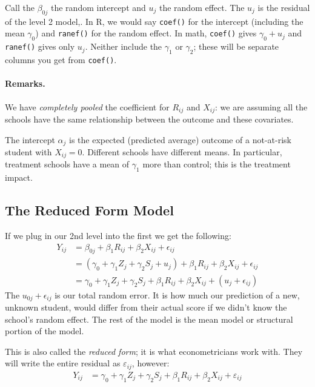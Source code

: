 \documentclass[
  letterpaper,
  DIV=11,
  numbers=noendperiod]{scrreprt}
\let\oldparagraph\paragraph
\renewcommand{\paragraph}[1]{\oldparagraph{#1}\mbox{}}
\begin{document}
Call the \(\beta_{0j}\) the random intercept and \(u_{j}\) the random
effect. The \(u_{j}\) is the residual of the level 2 model,. In R, we
would say \texttt{coef()} for the intercept (including the mean
\(\gamma_0\)) and \texttt{ranef()} for the random effect. In math,
\texttt{coef()} gives \(\gamma_0 + u_j\) and \texttt{ranef()} gives only
\(u_j\). Neither include the \(\gamma_1\) or \(\gamma_2\); these will be
separate columns you get from \texttt{coef()}.

\hypertarget{remarks.}{%
\paragraph{Remarks.}\label{remarks.}}

We have \emph{completely pooled} the coefficient for \(R_{ij}\) and
\(X_{ij}\): we are assuming all the schools have the same relationship
between the outcome and these covariates.

The intercept \(\alpha_{j}\) is the expected (predicted average) outcome
of a not-at-risk student with \(X_{ij} = 0\). Different schools have
different means. In particular, treatment schools have a mean of
\(\gamma_1\) more than control; this is the treatment impact.

\hypertarget{the-reduced-form-model}{%
\subsection{The Reduced Form Model}\label{the-reduced-form-model}}

If we plug in our 2nd level into the first we get the following:
\[\begin{aligned}
Y_{ij} &= \beta_{0j} + \beta_{1} R_{ij} + \beta_{2} X_{ij} + \epsilon_{ij} \\
&= (\gamma_{0} + \gamma_{1} Z_{j} + \gamma_{2} S_{j} + u_{j}) + \beta_1 R_{ij} + \beta_{2} X_{ij} + \epsilon_{ij} \\
&= \gamma_{0} + \gamma_{1} Z_{j} + \gamma_{2} S_{j} + \beta_{1} R_{ij} + \beta_{2} X_{ij} + (u_{j} + \epsilon_{ij})
\end{aligned}\] The \(u_{0j} + \epsilon_{ij}\) is our total random
error. It is how much our prediction of a new, unknown student, would
differ from their actual score if we didn't know the school's random
effect. The rest of the model is the mean model or structural portion of
the model.

This is also called the \emph{reduced form}; it is what econometricians
work with. They will write the entire residual as \(\varepsilon_{ij}\),
however: \[\begin{aligned}
Y_{ij} &= \gamma_{0} + \gamma_{1} Z_{j} + \gamma_{2} S_{j} + \beta_{1} R_{ij} + \beta_{2} X_{ij} + \varepsilon_{ij}
\end{aligned}\]
\end{document}
